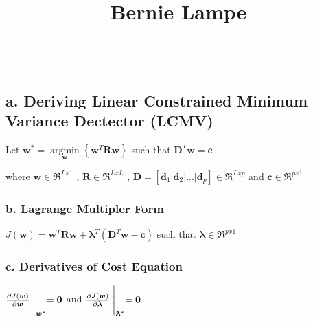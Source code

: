 \documentclass[paper=a4, fontsize=11pt]{scrartcl} %
\title{	
\normalfont \normalsize 
\Large Bernie Lampe \\
\horrule{2pt} \\[0.5cm] %
}
\numberwithin{equation}{section} %
\numberwithin{figure}{section} %
\numberwithin{table}{section} %
\begin{document}
\date{}

\maketitle %

\vspace{-35mm}

\subsection*{a. Deriving Linear Constrained Minimum Variance Dectector (LCMV)}

Let
\hspace{5pt}
\(
\bm{w}^* =
\underset{\bm{w}}{\operatorname{argmin}}
\left\{
\bm{w}^T\bm{R}\bm{w}
\right\}
\)
\hspace{8pt} such that \hspace{8pt}
\(
\bm{D}^T\bm{w} = \bm{c}
\)

\vspace{4mm}

where\hspace{5pt}
\(
\bm{w} \in \mathfrak{R}^{Lx1}
\)
,\hspace{5pt}
\(
\bm{R} \in \mathfrak{R}^{LxL}
\)
,\hspace{5pt}
\(
\bm{D} = \left[\bm{d}_1 | \bm{d}_2 | ... | \bm{d}_p\right] \in \mathfrak{R}^{Lxp}
\)
\hspace{5pt} and \hspace{5pt}
\(
\bm{c} \in \mathfrak{R}^{px1}
\)

\subsubsection*{b. Lagrange Multipler Form}

\(
J(\bm{w}) = 
\bm{w}^T\bm{R}\bm{w} + 
\bm{\lambda}^T
\left(\bm{D}^T\bm{w} - \bm{c}\right)
\)
\hspace{5pt} such that \hspace{5pt}
\(
\bm{\lambda} \in \mathfrak{R}^{px1}
\)

\subsubsection*{c. Derivatives of Cost Equation}
\(
\frac{\partial J(\bm{w})}{\partial \bm{w}}\Biggm\lvert_{\bm{w}^*}  = \bm{0}
\)
\hspace{5pt}and\hspace{5pt}
\(
\frac{\partial J(\bm{w})}{\partial \bm{\lambda}}\Biggm\lvert_{\bm{\lambda}^*}  = \bm{0}
\)
\end{document}
